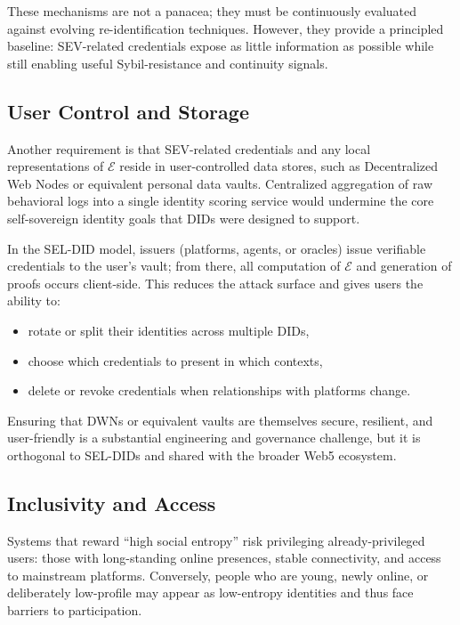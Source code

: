 \documentclass[11pt]{article}
\begin{document}
These mechanisms are not a panacea; they must be continuously evaluated against evolving re-identification techniques. However, they provide a principled baseline: SEV-related credentials expose as little information as possible while still enabling useful Sybil-resistance and continuity signals.

\subsection{User Control and Storage}

Another requirement is that SEV-related credentials and any local representations of $\mathcal{E}$ reside in user-controlled data stores, such as Decentralized Web Nodes or equivalent personal data vaults. Centralized aggregation of raw behavioral logs into a single identity scoring service would undermine the core self-sovereign identity goals that DIDs were designed to support.

In the SEL-DID model, issuers (platforms, agents, or oracles) issue verifiable credentials to the user's vault; from there, all computation of $\mathcal{E}$ and generation of proofs occurs client-side. This reduces the attack surface and gives users the ability to:

\begin{itemize}
  \item rotate or split their identities across multiple DIDs,
  \item choose which credentials to present in which contexts,
  \item delete or revoke credentials when relationships with platforms change.
\end{itemize}

Ensuring that DWNs or equivalent vaults are themselves secure, resilient, and user-friendly is a substantial engineering and governance challenge, but it is orthogonal to SEL-DIDs and shared with the broader Web5 ecosystem.

\subsection{Inclusivity and Access}

Systems that reward ``high social entropy'' risk privileging already-privileged users: those with long-standing online presences, stable connectivity, and access to mainstream platforms. Conversely, people who are young, newly online, or deliberately low-profile may appear as low-entropy identities and thus face barriers to participation.
\end{document}
